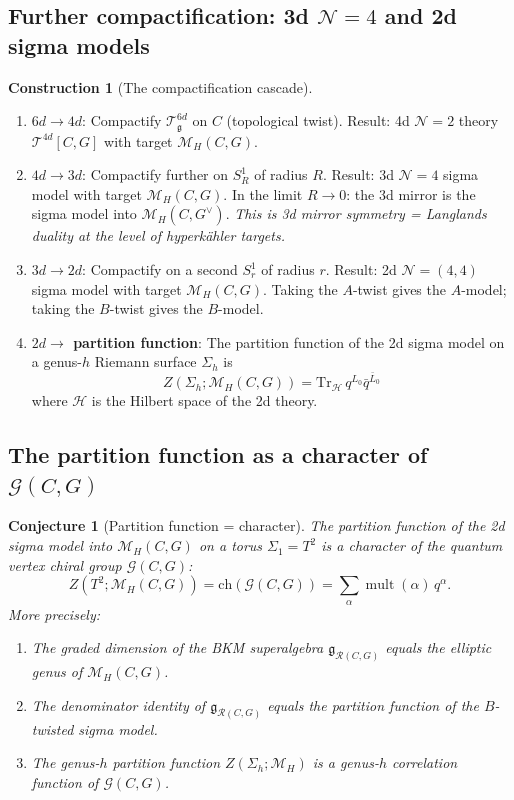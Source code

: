 \documentclass[11pt]{article}
\newtheorem{conjecture}[theorem]{Conjecture}
\theoremstyle{definition}
\newtheorem{construction}[theorem]{Construction}
\theoremstyle{remark}
\newcommand{\Tr}{\mathrm{Tr}}
\newcommand{\frakg}{\mathfrak{g}}
\newcommand{\cM}{\mathcal{M}}
\newcommand{\cN}{\mathcal{N}}
\newcommand{\cH}{\mathcal{H}}
\DeclareMathOperator{\mult}{mult}
\begin{document}
\subsection{Further compactification: 3d $\cN = 4$ and 2d sigma models}

\begin{construction}[The compactification cascade]
\label{constr:cascade}
\phantom{x}
\begin{enumerate}[label=\textbf{Step \arabic*.}]
 \item \textbf{$6d \to 4d$}: Compactify $\mathcal{T}^{6d}_\frakg$ on $C$ (topological twist). Result: 4d $\cN = 2$ theory $\mathcal{T}^{4d}[C, G]$ with target $\cM_H(C, G)$.

 \item \textbf{$4d \to 3d$}: Compactify further on $S^1_R$ of radius $R$. Result: 3d $\cN = 4$ sigma model with target $\cM_H(C, G)$. In the limit $R \to 0$: the 3d mirror is the sigma model into $\cM_H(C, G^\vee)$. \emph{This is 3d mirror symmetry = Langlands duality at the level of hyperk\"ahler targets.}

 \item \textbf{$3d \to 2d$}: Compactify on a second $S^1_r$ of radius $r$. Result: 2d $\cN = (4,4)$ sigma model with target $\cM_H(C, G)$. Taking the $A$-twist gives the $A$-model; taking the $B$-twist gives the $B$-model.

 \item \textbf{$2d \to$ partition function}: The partition function of the 2d sigma model on a genus-$h$ Riemann surface $\Sigma_h$ is
 \[
 Z(\Sigma_h; \cM_H(C, G)) = \Tr_{\cH} \, q^{L_0} \bar{q}^{\bar{L}_0}
 \]
 where $\cH$ is the Hilbert space of the 2d theory.
\end{enumerate}
\end{construction}

\subsection{The partition function as a character of $\mathcal{G}(C, G)$}

\begin{conjecture}[Partition function = character]
\label{conj:partition-function}
The partition function of the 2d sigma model into $\cM_H(C, G)$ on a torus $\Sigma_1 = T^2$ is a character of the quantum vertex chiral group $\mathcal{G}(C, G)$:
\[
 Z(T^2; \cM_H(C, G)) = \mathrm{ch}(\mathcal{G}(C, G)) = \sum_{\alpha} \mult(\alpha) \, q^\alpha.
\]
More precisely:
\begin{enumerate}[label=(\roman*)]
 \item The graded dimension of the BKM superalgebra $\frakg_{\mathcal{R}(C,G)}$ equals the elliptic genus of $\cM_H(C, G)$.
 \item The denominator identity of $\frakg_{\mathcal{R}(C,G)}$ equals the partition function of the $B$-twisted sigma model.
 \item The genus-$h$ partition function $Z(\Sigma_h; \cM_H)$ is a genus-$h$ correlation function of $\mathcal{G}(C, G)$.
\end{enumerate}
\end{conjecture}
\end{document}
